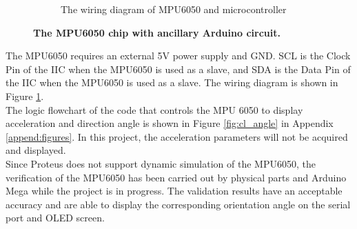 \begin{figure}[H]
\begin{subfigure}{0.45\textwidth}
        \caption{\centering The wiring diagram of MPU6050 and microcontroller}
        \label{fig:mpu6050_circuit}
    \end{subfigure}
    \caption[The MPU6050 chip with ancillary Arduino circuit]
    {\centering \textbf{The MPU6050 chip with ancillary Arduino circuit.}}
    \label{fig:mpu6050}
\end{figure}
\vspace{-5mm}
\noindent The MPU6050 requires an external 5V power supply and GND. SCL is the Clock Pin of the IIC when the 
MPU6050 is used as a slave, and SDA is the Data Pin of the IIC when the MPU6050 is used as a slave. The wiring 
diagram is shown in Figure \ref{fig:mpu6050_circuit}. \\
The logic flowchart of the code that controls the MPU 6050 to display acceleration and direction angle is shown 
in Figure \ref{fig:cl_angle} in Appendix \ref{append:figures}. In this project, the acceleration parameters will 
not be acquired and displayed. \\
Since Proteus does not support dynamic simulation of the MPU6050, the verification of the MPU6050 has been 
carried out by physical parts and Arduino Mega while the project is in progress. The validation results have 
an acceptable accuracy and are able to display the corresponding orientation angle on the serial port and 
OLED screen. 
